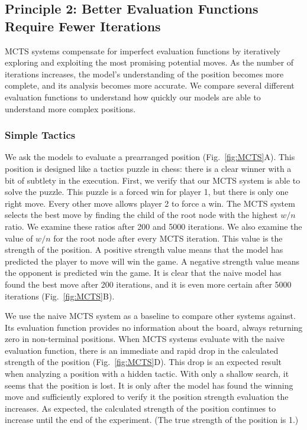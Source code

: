 \documentclass[10pt]{article}
\begin{document}
\subsection{Principle 2: Better Evaluation Functions Require Fewer Iterations}

MCTS systems compensate for imperfect evaluation functions by iteratively exploring and exploiting the most promising potential moves. As the number of iterations increases, the model's understanding of the position becomes more complete, and its analysis becomes more accurate. We compare several different evaluation functions to understand how quickly our models are able to understand more complex positions.


\subsubsection{Simple Tactics}
We ask the models to evaluate a prearranged position (Fig.~\ref{fig:MCTS}A). This position is designed like a tactics puzzle in chess: there is a clear winner with a bit of subtlety in the execution. First, we verify that our MCTS system is able to solve the puzzle. This puzzle is a forced win for player 1, but there is only one right move. Every other move allows player 2 to force a win. The MCTS system selects the best move by finding the child of the root node with the highest $w / n$ ratio. We examine these ratios after 200 and 5000 iterations. We also examine the value of $w / n$ for the root node after every MCTS iteration. This value is the strength of the position. A positive strength value means that the model has predicted the player to move will win the game. A negative strength value means the opponent is predicted win the game. It is clear that the naive model has found the best move after 200 iterations, and it is even more certain after 5000 iterations (Fig.~\ref{fig:MCTS}B).

We use the naive MCTS system as a baseline to compare other systems against. Its evaluation function provides no information about the board, always returning zero in non-terminal positions. When MCTS systems evaluate with the naive evaluation function, there is an immediate and rapid drop in the calculated strength of the position (Fig.~\ref{fig:MCTS}D). This drop is an expected result when analyzing a position with a hidden tactic. With only a shallow search, it seems that the position is lost. It is only after the model has found the winning move and sufficiently explored to verify it the position strength evaluation the increases. As expected, the calculated strength of the position continues to increase until the end of the experiment. (The true strength of the position is 1.)
\end{document}
